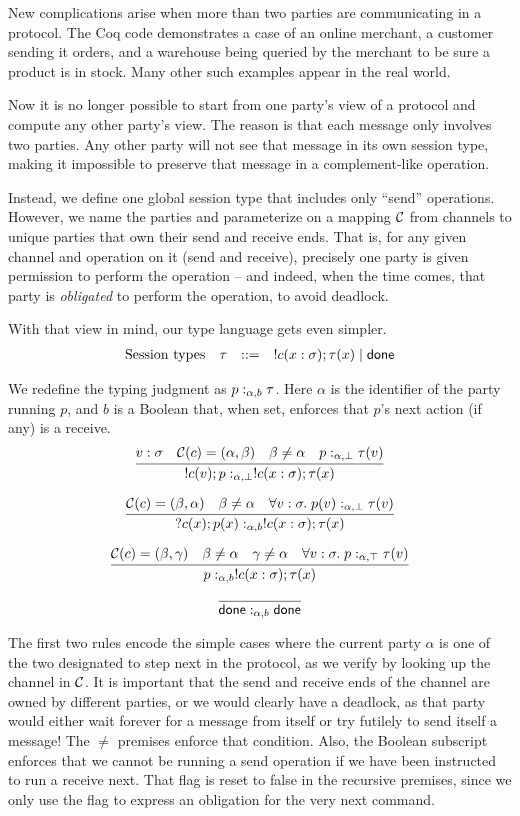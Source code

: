 \documentclass{amsbook}
\theoremstyle{definition}
\theoremstyle{remark}
\numberwithin{section}{chapter}
\numberwithin{equation}{chapter}
\begin{document}
New complications arise when more than two parties are communicating in a protocol.
The Coq code demonstrates a case of an online merchant, a customer sending it orders, and a warehouse being queried by the merchant to be sure a product is in stock.
Many other such examples appear in the real world.

Now it is no longer possible to start from one party's view of a protocol and compute any other party's view.
The reason is that each message only involves two parties.
Any other party will not see that message in its own session type, making it impossible to preserve that message in a complement-like operation.

Instead, we define one global session type that includes only ``send'' operations.
However, we name the parties and parameterize on a mapping $\mathcal C$ from channels to unique parties that own their send and receive ends.
That is, for any given channel and operation on it (send and receive), precisely one party is given permission to perform the operation -- and indeed, when the time comes, that party is \emph{obligated} to perform the operation, to avoid deadlock.

With that view in mind, our type language gets even simpler.
$$\begin{array}{rrcl}
  \textrm{Session types} & \tau &::=& !c(x : \sigma); \tau(x) \mid \mathsf{done}
\end{array}$$

We redefine the typing judgment as $p :_{\alpha,b} \tau$.
Here $\alpha$ is the identifier of the party running $p$, and $b$ is a Boolean that, when set, enforces that $p$'s next action (if any) is a receive.
$$\infer{\mpty{\send{c}{v}{p}}{\alpha}{\bot}{\send{c}{x : \sigma}{\tau(x)}}}{
  v : \sigma
  & \channels(c) = (\alpha, \beta)
  & \beta \neq \alpha
  & \mpty{p}{\alpha}{\bot}{\tau(v)}
}$$

$$\infer{\mpty{\recv{c}{x}{p(x)}}{\alpha}{b}{\send{c}{x : \sigma}{\tau(x)}}}{
  \channels(c) = (\beta, \alpha)
  & \beta \neq \alpha
  & \forall v : \sigma. \; \mpty{p(v)}{\alpha}{\bot}{\tau(v)}
}$$

$$\infer{\mpty{p}{\alpha}{b}{\send{c}{x : \sigma}{\tau(x)}}}{
  \channels(c) = (\beta, \gamma)
  & \beta \neq \alpha
  & \gamma \neq \alpha
  & \forall v : \sigma. \; \mpty{p}{\alpha}{\top}{\tau(v)}
}$$

$$\infer{\mpty{\done}{\alpha}{b}{\done}}{}$$

The first two rules encode the simple cases where the current party $\alpha$ is one of the two designated to step next in the protocol, as we verify by looking up the channel in $\mathcal C$.
It is important that the send and receive ends of the channel are owned by different parties, or we would clearly have a deadlock, as that party would either wait forever for a message from itself or try futilely to send itself a message!
The $\neq$ premises enforce that condition.
Also, the Boolean subscript enforces that we cannot be running a send operation if we have been instructed to run a receive next.
That flag is reset to false in the recursive premises, since we only use the flag to express an obligation for the very next command.
\end{document}
